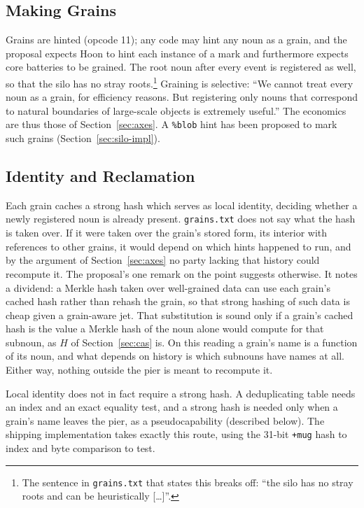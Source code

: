 \documentclass[twoside]{article}
\begin{document}
\subsection{Making Grains}

Grains are hinted (opcode 11); any code may hint any noun as a grain, and the proposal expects Hoon to hint each instance of a mark and furthermore expects core batteries to be grained.  The root noun after every event is registered as well, so that the silo has no stray roots.\footnote{The sentence in \texttt{grains.txt} that states this breaks off:  ``the silo has no stray roots and can be heuristically [\ldots{}]''.}  Graining is selective:  ``We cannot treat every noun as a grain, for efficiency reasons.  But registering only nouns that correspond to natural boundaries of large-scale objects is extremely useful.''  The economics are thus those of Section~\ref{sec:axes}.  A \texttt{\%blob} hint has been proposed to mark such grains (Section~\ref{sec:silo-impl}).

\subsection{Identity and Reclamation}

Each grain caches a strong hash which serves as local identity, deciding whether a newly registered noun is already present.  \texttt{grains.txt} does not say what the hash is taken over.  If it were taken over the grain's stored form, its interior with references to other grains, it would depend on which hints happened to run, and by the argument of Section~\ref{sec:axes} no party lacking that history could recompute it.  The proposal's one remark on the point suggests otherwise.  It notes a dividend:  a Merkle hash taken over well-grained data can use each grain's cached hash rather than rehash the grain, so that strong hashing of such data is cheap given a grain-aware jet.  That substitution is sound only if a grain's cached hash is the value a Merkle hash of the noun alone would compute for that subnoun, as $H$ of Section~\ref{sec:cas} is.  On this reading a grain's name is a function of its noun, and what depends on history is which subnouns have names at all.  Either way, nothing outside the pier is meant to recompute it.  %

Local identity does not in fact require a strong hash.  A deduplicating table needs an index and an exact equality test, and a strong hash is needed only when a grain's name leaves the pier, as a pseudocapability (described below).  The shipping implementation takes exactly this route, using the 31-bit \lstinline[style=inlinecode]{+mug} hash to index and byte comparison to test.
\end{document}
